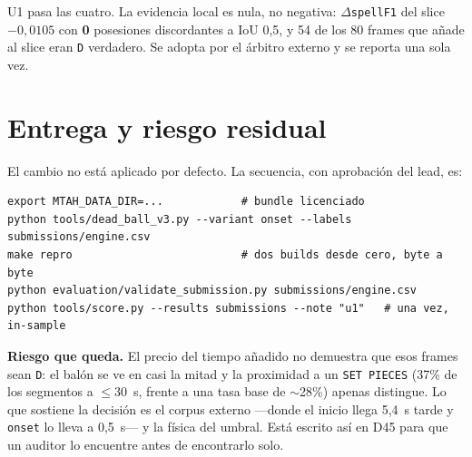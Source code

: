 \documentclass[11pt,a4paper]{article}
\newcommand{\code}[1]{\texttt{\small #1}}
\begin{document}
U1 pasa las cuatro. La evidencia local es nula, no negativa: $\Delta$\code{spellF1} del slice
$-0{,}0105$ con \textbf{0} posesiones discordantes a IoU 0,5, y 54 de los 80 frames que añade al
slice eran \code{D} verdadero. Se adopta por el árbitro externo y se reporta una sola vez.

\section{Entrega y riesgo residual}

El cambio no está aplicado por defecto. La secuencia, con aprobación del lead, es:

\begin{verbatim}
export MTAH_DATA_DIR=...            # bundle licenciado
python tools/dead_ball_v3.py --variant onset --labels submissions/engine.csv
make repro                          # dos builds desde cero, byte a byte
python evaluation/validate_submission.py submissions/engine.csv
python tools/score.py --results submissions --note "u1"   # una vez, in-sample
\end{verbatim}

\textbf{Riesgo que queda.} El precio del tiempo añadido no demuestra que esos frames sean \code{D}:
el balón se ve en casi la mitad y la proximidad a un \code{SET PIECES} (37\% de los segmentos a
$\leq 30$~s, frente a una tasa base de $\sim$28\%) apenas distingue. Lo que sostiene la decisión es
el corpus externo ---donde el inicio llega 5,4~s tarde y \texttt{onset} lo lleva a 0,5~s--- y la
física del umbral. Está escrito así en D45 para que un auditor lo encuentre antes de encontrarlo
solo.
\end{document}
